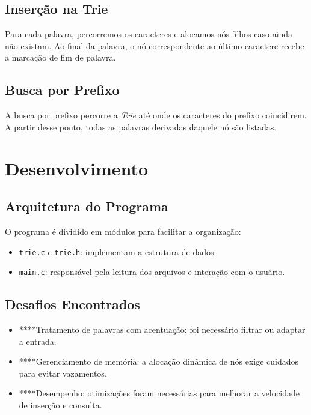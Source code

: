 \documentclass[12pt]{article}
\begin{document}
\subsection{Inserção na Trie}

Para cada palavra, percorremos os caracteres e alocamos nós filhos caso ainda não existam. Ao final da palavra, o nó correspondente ao último caractere recebe a marcação de fim de palavra.

\subsection{Busca por Prefixo}

A busca por prefixo percorre a \textit{Trie} até onde os caracteres do prefixo coincidirem. A partir desse ponto, todas as palavras derivadas daquele nó são listadas.

\section{Desenvolvimento}

\subsection{Arquitetura do Programa}

O programa é dividido em módulos para facilitar a organização:

\begin{itemize}
    \item \texttt{trie.c} e \texttt{trie.h}: implementam a estrutura de dados.
    \item \texttt{main.c}: responsável pela leitura dos arquivos e interação com o usuário.
\end{itemize}

\subsection{Desafios Encontrados}

\begin{itemize}
    \item ****Tratamento de palavras com acentuação: foi necessário filtrar ou adaptar a entrada.
    \item ****Gerenciamento de memória: a alocação dinâmica de nós exige cuidados para evitar vazamentos.
    \item ****Desempenho: otimizações foram necessárias para melhorar a velocidade de inserção e consulta.
\end{itemize}
\end{document}

